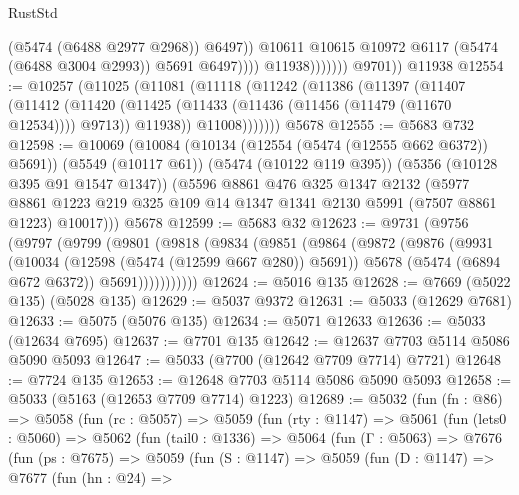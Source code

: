 \begin{lexlean}{RustStd}
\begin{coremodule}
                                  (@5474 (@6488 @2977 @2968))
                                  @6497))
                              @10611
                              @10615
                              @10972
                              @6117
                              (@5474 (@6488 @3004 @2993))
                              @5691
                              @6497))))
                      @11938)))))))
        @9701))
    @11938
@12554 := @10257
    (@11025
      (@11081
        (@11118
          (@11242
            (@11386
              (@11397
                (@11407
                  (@11412
                    (@11420
                      (@11425 (@11433 (@11436 (@11456 (@11479 (@11670 @12534)))) @9713))
                      @11938))
                  @11008)))))))
    @5678
@12555 := @5683 @732
@12598 := @10069
    (@10084
      (@10134 (@12554 (@5474 (@12555 @662 @6372)) @5691))
      (@5549 (@10117 @61))
      (@5474 (@10122 @119 @395))
      (@5356 (@10128 @395 @91 @1547 @1347))
      (@5596
        @8861
        @476
        @325
        @1347
        @2132
        (@5977 @8861 @1223 @219 @325 @109 @14 @1347 @1341 @2130 @5991 (@7507 @8861 @1223) @10017)))
    @5678
@12599 := @5683 @32
@12623 := @9731
    (@9756
      (@9797
        (@9799
          (@9801
            (@9818
              (@9834
                (@9851
                  (@9864
                    (@9872
                      (@9876
                        (@9931
                          (@10034 (@12598 (@5474 (@12599 @667 @280)) @5691))
                          @5678
                          (@5474 (@6894 @672 @6372))
                          @5691)))))))))))
@12624 := @5016 @135
@12628 := @7669 (@5022 @135) (@5028 @135)
@12629 := @5037 @9372
@12631 := @5033 (@12629 @7681)
@12633 := @5075 (@5076 @135)
@12634 := @5071 @12633
@12636 := @5033 (@12634 @7695)
@12637 := @7701 @135
@12642 := @12637 @7703 @5114 @5086 @5090 @5093
@12647 := @5033 (@7700 (@12642 @7709 @7714) @7721)
@12648 := @7724 @135
@12653 := @12648 @7703 @5114 @5086 @5090 @5093
@12658 := @5033 (@5163 (@12653 @7709 @7714) @1223)
@12689 := @5032
    (fun (fn : @86) =>
    @5058
      (fun (rc : @5057) =>
      @5059
        (fun (rty : @1147) =>
        @5061
          (fun (lets0 : @5060) =>
          @5062
            (fun (tail0 : @1336) =>
            @5064
              (fun (Γ : @5063) =>
              @7676
                (fun (ps : @7675) =>
                @5059
                  (fun (S : @1147) =>
                  @5059
                    (fun (D : @1147) =>
                    @7677
                      (fun (hn : @24) =>

\end{coremodule}
\end{lexlean}
